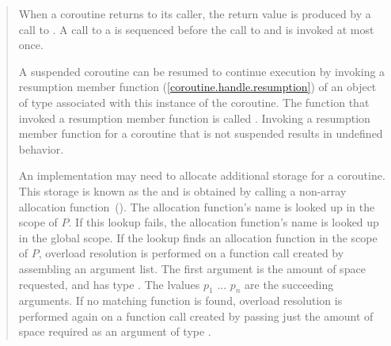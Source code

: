 \begin{quote}
\pnum 
When a coroutine returns to its caller, the return value is produced by a call to \linebreak
 \mbox{}. A call to a  is sequenced before the call to \linebreak
\mbox{} and is invoked at most once.



\pnum
A suspended coroutine can be resumed
to continue execution by invoking
a resumption member function (\ref{coroutine.handle.resumption}) of an object of type  
associated with this instance of the coroutine. The function that invoked a resumption member function is called . Invoking a resumption member function for a coroutine that is not suspended results in undefined behavior. 

\pnum
An implementation may need to allocate additional storage for a coroutine. 
This storage is known as the  and is obtained by calling a non-array allocation function~().
The allocation function's name is looked up in the scope of $P$. If this lookup fails, the allocation function's name is looked up in the global scope. If the lookup finds an allocation function in the scope of $P$, 
overload resolution is performed on a function call created by assembling an argument list. The first argument is the amount of space requested, and has type . The lvalues $p_1$ ... $p_n$ are the succeeding arguments. If no matching function is found, overload resolution is performed again on a function call created by passing just the amount of space required as an argument of type .



\end{quote}
